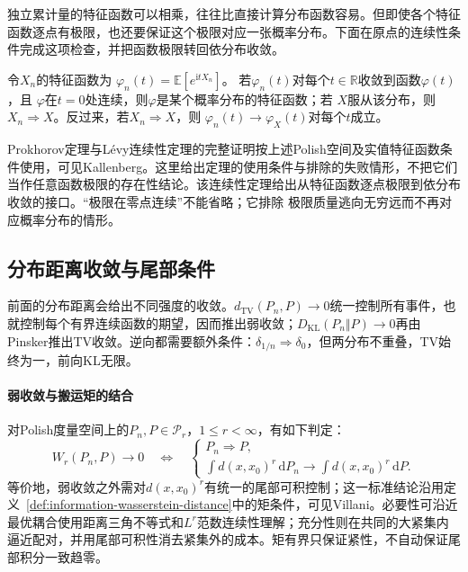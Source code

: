 独立累计量的特征函数可以相乘，往往比直接计算分布函数容易。但即使各个特征函数逐点有极限，也还要保证这个极限对应一张概率分布。下面在原点的连续性条件完成这项检查，并把函数极限转回依分布收敛。
\begin{theorem}[L\'evy连续性定理]
  \label{thm:probability-levy-continuity}
  令\(X_n\)的特征函数为
  \(\varphi_n(t)=\mathbb{E}[e^{\mathrm{i}tX_n}]\)。
  若\(\varphi_n(t)\)对每个\(t\in\mathbb{R}\)收敛到函数\(\varphi(t)\)，且
  \(\varphi\)在\(t=0\)处连续，则\(\varphi\)是某个概率分布的特征函数；若
  \(X\)服从该分布，则\(X_n\Rightarrow X\)。反过来，若\(X_n\Rightarrow X\)，则
  \(\varphi_n(t)\to\varphi_X(t)\)对每个\(t\)成立。
\end{theorem}

Prokhorov定理与L\'evy连续性定理的完整证明按上述Polish空间及实值特征函数条件使用，可见Kallenberg。这里给出定理的使用条件与排除的失败情形，不把它们当作任意函数极限的存在性结论。该连续性定理给出从特征函数逐点极限到依分布收敛的接口。“极限在零点连续”不能省略；它排除
极限质量逃向无穷远而不再对应概率分布的情形。


\subsection{分布距离收敛与尾部条件}
\label{sec:information-metric-convergence}

前面的分布距离会给出不同强度的收敛。\(d_{\mathrm{TV}}(P_n,P)\to0\)统一控制所有事件，也就控制每个有界连续函数的期望，因而推出弱收敛；\(D_{\mathrm{KL}}(P_n\Vert P)\to0\)再由Pinsker推出TV收敛。逆向都需要额外条件：\(\delta_{1/n}\Rightarrow\delta_0\)，但两分布不重叠，TV始终为一，前向KL无限。

\paragraph{弱收敛与搬运矩的结合}
对Polish度量空间上的\(P_n,P\in\mathcal P_r\)，\(1\leq r<\infty\)，有如下判定：
\begin{equation}
 W_r(P_n,P)\longrightarrow0
 \quad\Longleftrightarrow\quad
 \begin{cases}
 P_n\Rightarrow P,\\
 \displaystyle\int d(x,x_0)^r\,\mathrm dP_n
 \longrightarrow\int d(x,x_0)^r\,\mathrm dP.
 \end{cases}
 \label{eq:information-wasserstein-convergence}
\end{equation}
等价地，弱收敛之外需对\(d(x,x_0)^r\)有统一的尾部可积控制；这一标准结论沿用定义~\ref{def:information-wasserstein-distance}中的矩条件，可见Villani。必要性可沿近最优耦合使用距离三角不等式和\(L^r\)范数连续性理解；充分性则在共同的大紧集内逼近配对，并用尾部可积性消去紧集外的成本。矩有界只保证紧性，不自动保证尾部积分一致趋零。

